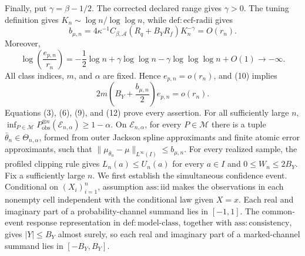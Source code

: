 Finally, put \(\gamma=\beta-1/2\).  The corrected declared range gives
\(\gamma>0\).  The tuning definition gives
\(K_n\sim\log n/\log\log n\), while
\(\mathrm{def{:}ecf\text{-}radii}\) gives
\[
 b_{\mu,n}
 =4\kappa^{-1}C_{\beta,\mathcal A}(R_q+B_YR_f)K_n^{-\gamma}
 =O(r_n).                                                           \tag{10}
\]
Moreover,
\[
 \log\left(\frac{e_{p,n}}{r_n}\right)
 =-\frac12\log n+\gamma\log\log n
   -\gamma\log\log\log n+O(1)\longrightarrow-\infty.             \tag{11}
\]
All class indices, \(m\), and \(\alpha\) are fixed.  Hence
\(e_{p,n}=o(r_n)\), and (10) implies
\[
 2m\left(B_Y+\frac{b_{\mu,n}}2\right)e_{p,n}=o(r_n).              \tag{12}
\]
Equations (3), (6), (9), and (12) prove every assertion.
For all sufficiently large \(n\),
\(\inf_{P\in\mathcal M}P_{\mathrm{obs}}^{\otimes n}
(\mathcal E_{n,\alpha})\ge1-\alpha\).  On \(\mathcal E_{n,\alpha}\),
for every \(P\in\mathcal M\) there is a tuple
\(\bar\theta_n\in\Theta_{n,\alpha}\), formed from outer Jackson spline
approximants and finite atomic error approximants, such that
\(\|\mu_{\bar\theta_n}-\mu\|_{L^\infty(I)}\le b_{\mu,n}\).  For every
realized sample, the profiled clipping rule gives \(L_n(a)\le U_n(a)\) for
every \(a\in I\) and \(0\le W_n\le2B_Y\).
Fix a sufficiently large \(n\).  We first establish the simultaneous
confidence event.  Conditional on \((X_i)_{i=1}^n\), assumption
\(\mathrm{ass{:}iid}\) makes the observations in each nonempty cell
independent with the conditional law given \(X=x\).  Each real and imaginary
part of a probability-channel summand lies in \([-1,1]\).  The common-event
response representation in \(\mathrm{def{:}model\text{-}class}\), together
with \(\mathrm{ass{:}consistency}\), gives \(|Y|\le B_Y\) almost surely, so
each real and imaginary part of a marked-channel summand lies in
\([-B_Y,B_Y]\).

